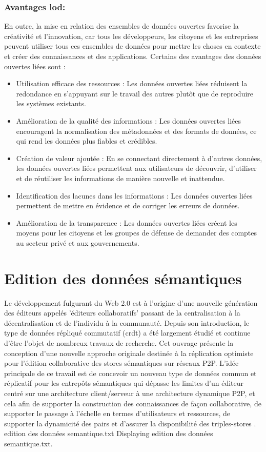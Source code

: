 \documentclass[12pt]{report}
\begin{document}
\subsubsection{Avantages \acs{lod}:}
En outre, la mise en relation des ensembles de données ouvertes favorise la créativité et l'innovation, car
tous les développeurs, les citoyens et les entreprises peuvent utiliser tous ces ensembles de données pour
mettre les choses en contexte et créer des connaissances et des applications.
Certains des avantages des données ouvertes liées sont :
\begin{itemize}
 \item Utilisation efficace des ressources : Les données ouvertes liées réduisent la redondance en s'appuyant sur
le travail des autres plutôt que de reproduire les systèmes existants.
\item Amélioration de la qualité des informations : Les données ouvertes liées encouragent la normalisation des
métadonnées et des formats de données, ce qui rend les données plus fiables et crédibles.
\item Création de valeur ajoutée : En se connectant directement à d'autres données, les données ouvertes liées
permettent aux utilisateurs de découvrir, d'utiliser et de réutiliser les informations de manière nouvelle et
inattendue.
\item Identification des lacunes dans les informations : Les données ouvertes liées permettent de mettre en
évidence et de corriger les erreurs de données.
\item Amélioration de la transparence : Les données ouvertes liées créent les moyens pour les citoyens et les
groupes de défense de demander des comptes au secteur privé et aux gouvernements.
\end{itemize}

\section{Edition des données sémantiques}
Le développement fulgurant du Web 2.0 est à l’origine d’une nouvelle génération des éditeurs appelés 'éditeurs collaboratifs' passant de la centralisation à la décentralisation et de l’individu à la communauté. Depuis son introduction, le type de données répliqué commutatif (\acs{crdt}) a été largement étudié et continue d'être l'objet de nombreux travaux de recherche. Cet ouvrage présente la conception d’une nouvelle approche originale destinée à la réplication optimiste pour l’édition collaborative des stores sémantiques sur réseaux P2P. L’idée principale de ce travail est de concevoir un nouveau type de données commun et réplicatif pour les entrepôts sémantiques qui dépasse les limites d’un éditeur centré sur une architecture client/serveur à une architecture dynamique P2P, et cela afin de supporter la construction des connaissances de façon collaborative, de supporter le passage à l’échelle en termes d’utilisateurs et ressources, de supporter la dynamicité des pairs et d’assurer la disponibilité des triples-stores \cite{EDIT}.
edition des données semantique.txt
Displaying edition des données semantique.txt.
\end{document}
